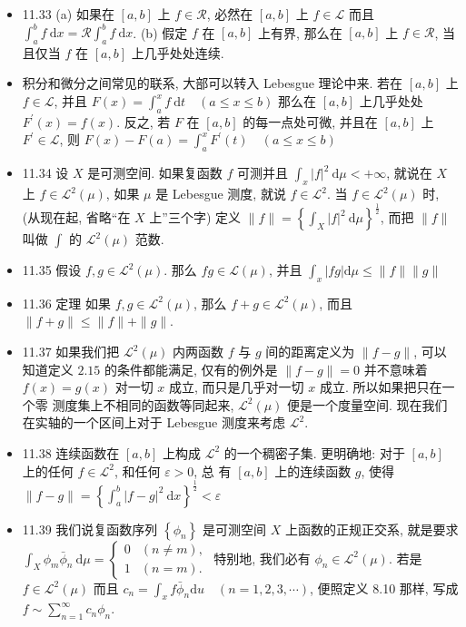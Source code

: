 \begin{itemize}
\item 11.33 (a) 如果在 $[a, b]$ 上 $f \in\mathscr{R}$, 必然在 $[a, b]$ 上 $f \in \mathscr{L}$ 而且 $\int_{a}^{b} f \mathrm{~d} x=\mathscr{R} \int_{a}^{b} f \mathrm{~d} x$. (b) 假定 $f$ 在 $[a , b]$ 上有界, 那么在 $[a,b]$ 上 $f \in \mathscr{R}$, 当且仅当 $f$ 在 $[a, b]$ 上几乎处处连续.

\item 积分和微分之间常见的联系, 大部可以转入 Lebesgue 理论中来. 若在 $[a, b]$ 上 $f \in \mathscr{L}$, 并且 $F(x)=\int_{a}^{x} f \mathrm{~d} t \quad(a \leqslant x \leqslant b)$ 那么在 $[a, b]$ 上几乎处处 $F^{\prime}(x)=f(x)$. 反之, 若 $F$ 在 $[a, b]$ 的每一点处可微, 并且在 $[a, b]$ 上 $F^{\prime} \in \mathscr{L}$, 则 $F(x)-F(a)=\int_{a}^{x} F^{\prime}(t) \quad(a \leqslant x \leqslant b)$

\item 11.34 设 $X$ 是可测空间. 如果复函数 $f$ 可测并且 $\int_{x}|f|^{2} \mathrm{~d} \mu<+\infty$, 就说在 $X$ 上 $f \in \mathscr{L}^{2}(\mu)$, 如果 $\mu$ 是 Lebesgue 测度, 就说 $f \in \mathscr{L}^{2}$. 当 $f \in \mathscr{L}^{2}(\mu)$ 时, (从现在起, 省略“在 $X$ 上”三个字) 定义 $\|f\|=\left\{\int_{X}|f|^{2} \mathrm{~d} \mu\right\}^{\frac{1}{2}}$, 而把 $\|f\|$ 叫做 $\int$ 的 $\mathscr{L}^{2}(\mu)$ 范数.

\item 11.35 假设 $f, g \in \mathscr{L}^{2}(\mu)$. 那么 $f g \in \mathscr{L}(\mu)$, 并且 $\int_{x}|f g| \mathrm{d} \mu \leqslant\|f\|\|g\|$

\item 11.36 定理 如果 $f, g \in \mathscr{L}^{2}(\mu)$, 那么 $f+g \in \mathscr{L}^{2}(\mu)$, 而且 $\|f+g\| \leqslant\|f\|+\|g\|$.

\item 11.37 如果我们把 $\mathscr{L}^{2}(\mu)$ 内两函数 $f$ 与 $g$ 间的距离定义为 $\|f-g\|$, 可以知道定义 $2.15$ 的条件都能满足, 仅有的例外是 $\|f-g\|=0$ 并不意味着 $f(x)=g(x)$ 对一切 $x$ 成立, 而只是几乎对一切 $x$ 成立. 所以如果把只在一个零 测度集上不相同的函数等同起来, $\mathscr{L}^{2}(\mu)$ 便是一个度量空间. 现在我们在实轴的一个区间上对于 Lebesgue 测度来考虑 $\mathscr{L}^{2}$.

\item 11.38 连续函数在 $[a, b]$ 上构成 $\mathscr{L}^{2}$ 的一个稠密子集. 更明确地: 对于 $[a, b]$ 上的任何 $f \in \mathscr{L}^{2}$, 和任何 $\varepsilon>0$, 总 有 $[a, b]$ 上的连续函数 $g$, 使得 $\|f-g\|=\left\{\int_{a}^{b}|f-g|^{2} \mathrm{~d} x\right\}^{\frac{1}{2}}<\varepsilon$

\item 11.39 我们说复函数序列 $\left\{\phi_{n}\right\}$ 是可测空间 $X$ 上函数的正规正交系, 就是要求 $\int_{X} \phi_{m} \bar{\phi}_{n} \mathrm{~d} \mu= \begin{cases}0 & (n \neq m), \\ 1 & (n=m) .\end{cases}$ 特别地, 我们必有 $\phi_{n} \in \mathscr{L}^{2}(\mu)$. 若是 $f \in \mathscr{L}^{2}(\mu)$ 而且 $c_{n}=\int_{x} f \bar{\phi}_{n}\mathrm{d}u \quad(n=1,2,3, \cdots)$, 便照定义 8.10 那样, 写成 $f \sim \sum_{n=1}^{\infty} c_{n} \phi_{n}$.


\end{itemize}

